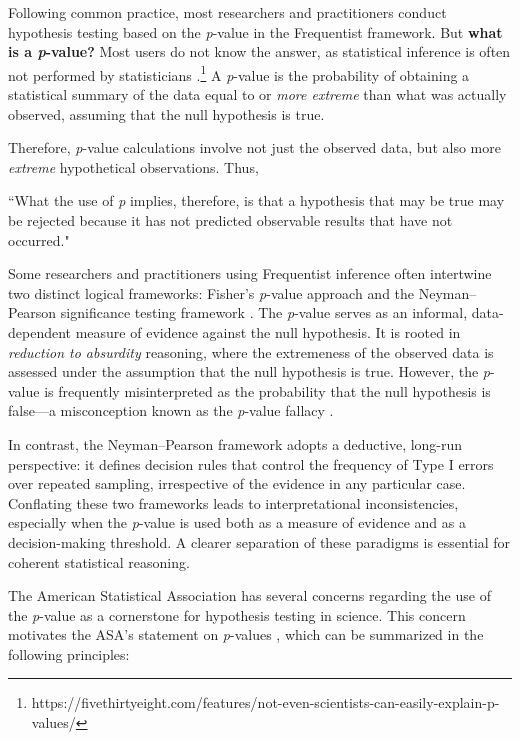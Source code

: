 Following common practice, most researchers and practitioners conduct hypothesis testing based on the \textit{p}-value in the Frequentist framework. But \textbf{what is a \textit{p}-value?} Most users do not know the answer, as statistical inference is often not performed by statisticians \cite{Berger2006}.\footnote{https://fivethirtyeight.com/features/not-even-scientists-can-easily-explain-p-values/} A \textit{p}-value is the probability of obtaining a statistical summary of the data equal to or \textit{more extreme} than what was actually observed, assuming that the null hypothesis is true.

Therefore, \textit{p}-value calculations involve not just the observed data, but also more \textit{extreme} hypothetical observations. Thus,

``What the use of \textit{p} implies, therefore, is that a hypothesis that may be true may be rejected because it has not predicted observable results that have not occurred." \cite{Jeffreys1961}

Some researchers and practitioners using Frequentist inference often intertwine two distinct logical frameworks: Fisher’s \textit{p}-value approach \cite{Fisher1958} and the Neyman--Pearson significance testing framework \cite{Neyman1933}. The \textit{p}-value serves as an informal, data-dependent measure of evidence against the null hypothesis. It is rooted in \textit{reduction to absurdity} reasoning, where the extremeness of the observed data is assessed under the assumption that the null hypothesis is true. However, the \textit{p}-value is frequently misinterpreted as the probability that the null hypothesis is false—a misconception known as the \textit{p}-value fallacy \cite{Goodman1999}. 

In contrast, the Neyman--Pearson framework adopts a deductive, long-run perspective: it defines decision rules that control the frequency of Type I errors over repeated sampling, irrespective of the evidence in any particular case. Conflating these two frameworks leads to interpretational inconsistencies, especially when the \textit{p}-value is used both as a measure of evidence and as a decision-making threshold. A clearer separation of these paradigms is essential for coherent statistical reasoning.

The American Statistical Association has several concerns regarding the use of the \textit{p}-value as a cornerstone for hypothesis testing in science. This concern motivates the ASA's statement on \textit{p}-values \cite{Wasserstein2016}, which can be summarized in the following principles:

